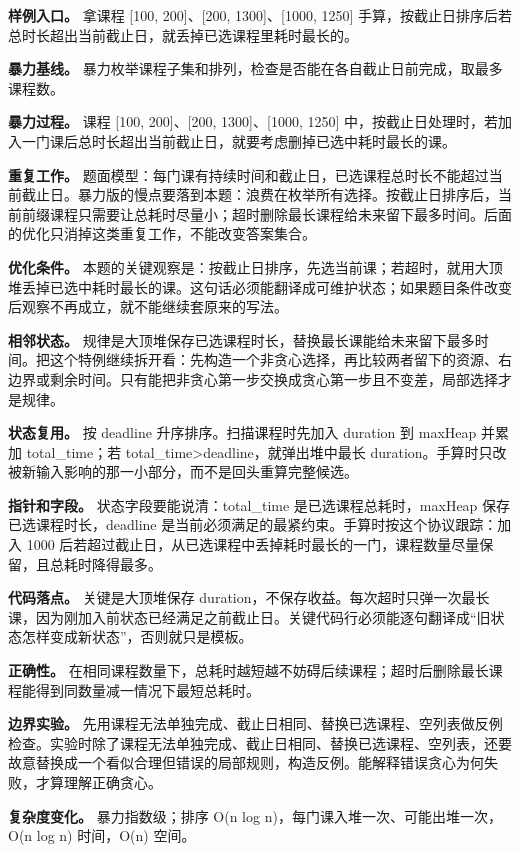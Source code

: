 \textbf{样例入口。} 拿课程 [100, 200]、[200, 1300]、[1000, 1250] 手算，按截止日排序后若总时长超出当前截止日，就丢掉已选课程里耗时最长的。

\textbf{暴力基线。} 暴力枚举课程子集和排列，检查是否能在各自截止日前完成，取最多课程数。

\textbf{暴力过程。} 课程 [100, 200]、[200, 1300]、[1000, 1250] 中，按截止日处理时，若加入一门课后总时长超出当前截止日，就要考虑删掉已选中耗时最长的课。

\textbf{重复工作。} 题面模型：每门课有持续时间和截止日，已选课程总时长不能超过当前截止日。暴力版的慢点要落到本题：浪费在枚举所有选择。按截止日排序后，当前前缀课程只需要让总耗时尽量小；超时删除最长课程给未来留下最多时间。后面的优化只消掉这类重复工作，不能改变答案集合。

\textbf{优化条件。} 本题的关键观察是：按截止日排序，先选当前课；若超时，就用大顶堆丢掉已选中耗时最长的课。这句话必须能翻译成可维护状态；如果题目条件改变后观察不再成立，就不能继续套原来的写法。

\textbf{相邻状态。} 规律是大顶堆保存已选课程时长，替换最长课能给未来留下最多时间。把这个特例继续拆开看：先构造一个非贪心选择，再比较两者留下的资源、右边界或剩余时间。只有能把非贪心第一步交换成贪心第一步且不变差，局部选择才是规律。

\textbf{状态复用。} 按 deadline 升序排序。扫描课程时先加入 duration 到 maxHeap 并累加 total\_time；若 total\_time>deadline，就弹出堆中最长 duration。手算时只改被新输入影响的那一小部分，而不是回头重算完整候选。

\textbf{指针和字段。} 状态字段要能说清：total\_time 是已选课程总耗时，maxHeap 保存已选课程时长，deadline 是当前必须满足的最紧约束。手算时按这个协议跟踪：加入 1000 后若超过截止日，从已选课程中丢掉耗时最长的一门，课程数量尽量保留，且总耗时降得最多。

\textbf{代码落点。} 关键是大顶堆保存 duration，不保存收益。每次超时只弹一次最长课，因为刚加入前状态已经满足之前截止日。关键代码行必须能逐句翻译成“旧状态怎样变成新状态”，否则就只是模板。

\textbf{正确性。} 在相同课程数量下，总耗时越短越不妨碍后续课程；超时后删除最长课程能得到同数量减一情况下最短总耗时。

\textbf{边界实验。} 先用课程无法单独完成、截止日相同、替换已选课程、空列表做反例检查。实验时除了课程无法单独完成、截止日相同、替换已选课程、空列表，还要故意替换成一个看似合理但错误的局部规则，构造反例。能解释错误贪心为何失败，才算理解正确贪心。

\textbf{复杂度变化。} 暴力指数级；排序 O(n log n)，每门课入堆一次、可能出堆一次，O(n log n) 时间，O(n) 空间。

